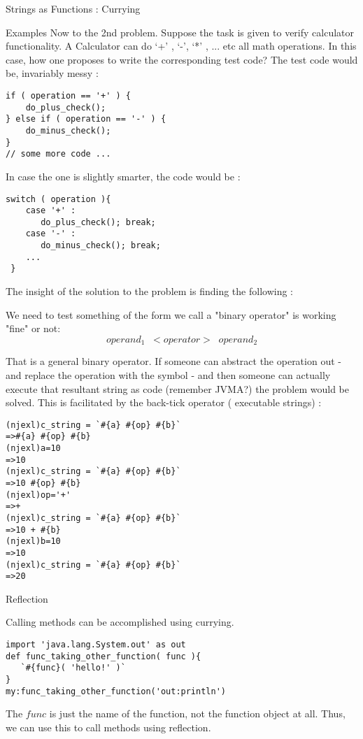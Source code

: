 \begin{section}{Strings as Functions : Currying}
\begin{subsection}{Examples}
Now to the 2nd problem.
Suppose the task is given to verify calculator functionality. 
A Calculator can do `+' , `-', `*' , ... etc all math operations. 
In this case, how one proposes to write the corresponding test code?
The test code would be, invariably messy :

\begin{lstlisting}[style=JexlStyle]
if ( operation == '+' ) {
    do_plus_check();
} else if ( operation == '-' ) {
    do_minus_check();
}
// some more code ...
\end{lstlisting}

In case the one is slightly smarter, the code would be :

\begin{lstlisting}[style=JexlStyle]
switch ( operation ){
    case '+' :
       do_plus_check(); break;
    case '-' :
       do_minus_check(); break;
    ...
 }
\end{lstlisting} 

The insight of the solution to the problem is finding the following :

\begin{center}
We need to test something of the form we call a "binary operator" is working "fine" or not:
$$
operand_1 \; \;  <operator> \; \;  operand_2 
$$
\end{center}

That is a general binary operator. If someone can abstract the operation out - and replace the operation with the symbol - 
and then someone can actually execute that resultant string as code (remember JVMA?) the problem would be solved.
This is facilitated by the back-tick operator ( executable strings) :

\begin{lstlisting}[style=all]
(njexl)c_string = `#{a} #{op} #{b}`
=>#{a} #{op} #{b}
(njexl)a=10
=>10
(njexl)c_string = `#{a} #{op} #{b}`
=>10 #{op} #{b}
(njexl)op='+'
=>+
(njexl)c_string = `#{a} #{op} #{b}`
=>10 + #{b}
(njexl)b=10
=>10
(njexl)c_string = `#{a} #{op} #{b}`
=>20
\end{lstlisting}
\end{subsection}

\begin{subsection}{Reflection}

Calling methods can be accomplished using currying. 

\begin{lstlisting}[style=JexlStyle]
import 'java.lang.System.out' as out 
def func_taking_other_function( func ){
   `#{func}( 'hello!' )`
}
my:func_taking_other_function('out:println')
\end{lstlisting}
The $func$ is just the name of the function, not the function object at all.
Thus, we can use this to call methods using reflection.
\end{subsection}


\end{section}
